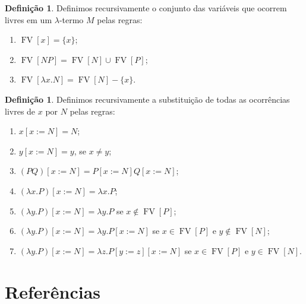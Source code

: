 \documentclass[12pt]{article}
\theoremstyle{definition}
\newtheorem{definition}[theorem]{Definição}
\DeclareMathOperator{\FV}{\mathrm{FV}}
\begin{document}
\begin{definition}
  Definimos recursivamente o conjunto das variáveis que ocorrem livres em um $\lambda$-termo $M$ pelas regras:
  \begin{enumerate}
  \item $\FV[x] = \{x\}$;
  \item $\FV[NP] = \FV[N] \cup \FV[P]$;
  \item $\FV[\lambda x.N] = \FV[N] - \{x\}$.
  \end{enumerate}
\end{definition}
\vspace{1cm}

\begin{definition}
  Definimos recursivamente a substituição de todas as ocorrências livres de $x$ por $N$ pelas regras:
  \begin{enumerate}
  \item $x[x := N] = N$;
  \item $y[x := N] = y$, se $x \neq y$;
  \item $(PQ)[x := N] = P[x := N] Q[x := N]$;
  \item $(\lambda x.P)[x := N] = \lambda x.P$;
  \item $(\lambda y.P)[x := N] = \lambda y.P$ se $x \not\in \FV[P]$;
  \item $(\lambda y.P)[x := N] = \lambda y.P[x := N]$ se $x \in \FV[P]$ e $y \not\in \FV[N]$;
  \item $(\lambda y.P)[x := N] = \lambda z.P[y := z][x := N]$ se $x \in \FV[P]$ e $y \in \FV[N]$.  
  \end{enumerate}
\end{definition}


\section{Referências}

\nocite{*}


\end{document}
